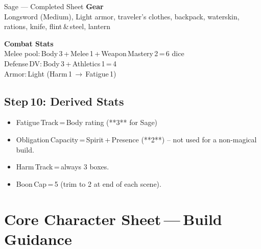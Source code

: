 \documentclass[10pt]{article}
\begin{document}
\begin{charbox}{Sage --- Completed Sheet}
    \vspace{0.5em}
    \textbf{Gear}\\
    Longsword (Medium), Light armor, traveler's clothes, backpack, waterskin, rations, knife, flint & steel, lantern
    
    \vspace{0.5em}
    \textbf{Combat Stats}\\
    Melee pool: Body 3 + Melee 1 + Weapon Mastery 2 = 6 dice\\
    Defense DV: Body 3 + Athletics 1 = 4\\
    Armor: Light (Harm 1 $\rightarrow$ Fatigue 1)\\
\end{charbox}

\subsection*{Step 10: Derived Stats}
\begin{itemize}
  \item Fatigue Track = Body rating (**3** for Sage)  
  \item Obligation Capacity = Spirit + Presence (**2**) -- not used for a non-magical build.  
  \item Harm Track = always 3 boxes.  
  \item Boon Cap = 5 (trim to 2 at end of each scene).  
\end{itemize}


\newpage
\section*{Core Character Sheet --- Build Guidance}
\end{document}
